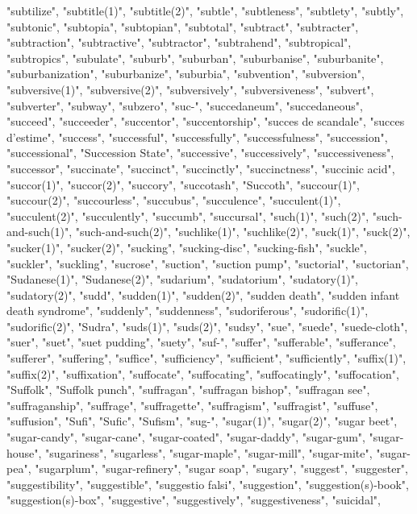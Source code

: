 "subtilize",
"subtitle(1)",
"subtitle(2)",
"subtle",
"subtleness",
"subtlety",
"subtly",
"subtonic",
"subtopia",
"subtopian",
"subtotal",
"subtract",
"subtracter",
"subtraction",
"subtractive",
"subtractor",
"subtrahend",
"subtropical",
"subtropics",
"subulate",
"suburb",
"suburban",
"suburbanise",
"suburbanite",
"suburbanization",
"suburbanize",
"suburbia",
"subvention",
"subversion",
"subversive(1)",
"subversive(2)",
"subversively",
"subversiveness",
"subvert",
"subverter",
"subway",
"subzero",
"suc-",
"succedaneum",
"succedaneous",
"succeed",
"succeeder",
"succentor",
"succentorship",
"succes de scandale",
"succes d'estime",
"success",
"successful",
"successfully",
"successfulness",
"succession",
"successional",
"Succession State",
"successive",
"successively",
"successiveness",
"successor",
"succinate",
"succinct",
"succinctly",
"succinctness",
"succinic acid",
"succor(1)",
"succor(2)",
"succory",
"succotash",
"Succoth",
"succour(1)",
"succour(2)",
"succourless",
"succubus",
"succulence",
"succulent(1)",
"succulent(2)",
"succulently",
"succumb",
"succursal",
"such(1)",
"such(2)",
"such-and-such(1)",
"such-and-such(2)",
"suchlike(1)",
"suchlike(2)",
"suck(1)",
"suck(2)",
"sucker(1)",
"sucker(2)",
"sucking",
"sucking-disc",
"sucking-fish",
"suckle",
"suckler",
"suckling",
"sucrose",
"suction",
"suction pump",
"suctorial",
"suctorian",
"Sudanese(1)",
"Sudanese(2)",
"sudarium",
"sudatorium",
"sudatory(1)",
"sudatory(2)",
"sudd",
"sudden(1)",
"sudden(2)",
"sudden death",
"sudden infant death syndrome",
"suddenly",
"suddenness",
"sudoriferous",
"sudorific(1)",
"sudorific(2)",
"Sudra",
"suds(1)",
"suds(2)",
"sudsy",
"sue",
"suede",
"suede-cloth",
"suer",
"suet",
"suet pudding",
"suety",
"suf-",
"suffer",
"sufferable",
"sufferance",
"sufferer",
"suffering",
"suffice",
"sufficiency",
"sufficient",
"sufficiently",
"suffix(1)",
"suffix(2)",
"suffixation",
"suffocate",
"suffocating",
"suffocatingly",
"suffocation",
"Suffolk",
"Suffolk punch",
"suffragan",
"suffragan bishop",
"suffragan see",
"suffraganship",
"suffrage",
"suffragette",
"suffragism",
"suffragist",
"suffuse",
"suffusion",
"Sufi",
"Sufic",
"Sufism",
"sug-",
"sugar(1)",
"sugar(2)",
"sugar beet",
"sugar-candy",
"sugar-cane",
"sugar-coated",
"sugar-daddy",
"sugar-gum",
"sugar-house",
"sugariness",
"sugarless",
"sugar-maple",
"sugar-mill",
"sugar-mite",
"sugar-pea",
"sugarplum",
"sugar-refinery",
"sugar soap",
"sugary",
"suggest",
"suggester",
"suggestibility",
"suggestible",
"suggestio falsi",
"suggestion",
"suggestion(s)-book",
"suggestion(s)-box",
"suggestive",
"suggestively",
"suggestiveness",
"suicidal",
